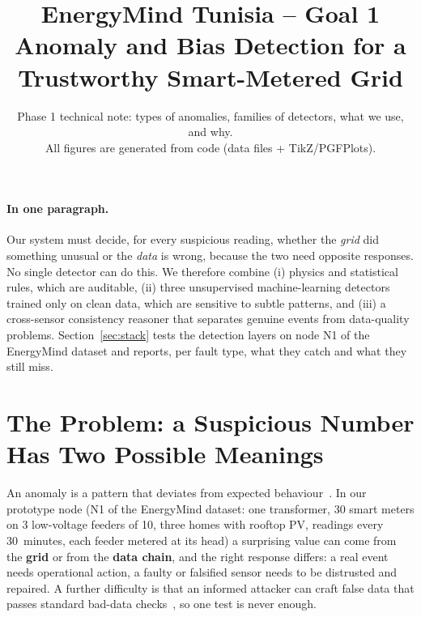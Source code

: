 \documentclass[11pt,a4paper]{article}
\title{EnergyMind Tunisia -- Goal 1\\[2pt]\large Anomaly and Bias Detection for a Trustworthy Smart-Metered Grid}
\author{}
\date{\small Phase 1 technical note: types of anomalies, families of detectors, what we use, and why.\\
All figures are generated from code (data files + TikZ/PGFPlots).}
\begin{document}
\maketitle

\paragraph{In one paragraph.} Our system must decide, for every suspicious reading, whether the \emph{grid}
did something unusual or the \emph{data} is wrong, because the two need opposite responses. No single
detector can do this. We therefore combine (i) physics and statistical rules, which are auditable,
(ii) three unsupervised machine-learning detectors trained only on clean data, which are sensitive to subtle
patterns, and (iii) a cross-sensor consistency reasoner that separates genuine events from data-quality
problems. Section~\ref{sec:stack} tests the detection layers on node N1 of the EnergyMind dataset and
reports, per fault type, what they catch and what they still miss.

\section{The Problem: a Suspicious Number Has Two Possible Meanings}
\label{sec:problem}
An anomaly is a pattern that deviates from expected behaviour~\cite{chandola}. In our prototype node (N1 of
the EnergyMind dataset: one transformer, 30 smart meters on 3 low-voltage feeders of 10, three homes with
rooftop PV, readings every 30~minutes, each feeder metered at its head) a surprising value can come from the
\textbf{grid} or from
the \textbf{data chain}, and the right response differs: a real event needs operational action, a faulty or
falsified sensor needs to be distrusted and repaired. A further difficulty is that an informed attacker can
craft false data that passes standard bad-data checks~\cite{fdi}, so one test is never enough.
\end{document}
